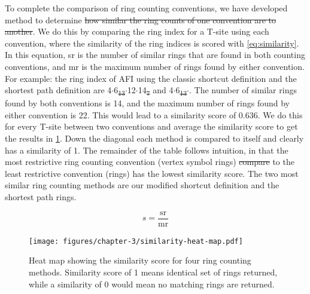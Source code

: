 \documentclass[preprint,numrefs,noinfo,sort&compress]{elsarticle}
\providecommand{\DIFadd}[1]{{\protect\color{blue}\uwave{#1}}} %
\providecommand{\DIFdel}[1]{{\protect\color{red}\sout{#1}}}                      %
\providecommand{\DIFaddbegin}{} %
\providecommand{\DIFaddend}{} %
\providecommand{\DIFdelbegin}{} %
\providecommand{\DIFdelend}{} %
\providecommand{\DIFaddbeginFL}{} %
\providecommand{\DIFaddendFL}{} %
\providecommand{\DIFdelbeginFL}{} %
\providecommand{\DIFdelendFL}{} %
\newcommand{\DIFscaledelfig}{0.5}
\newlength{\DIFdelgraphicswidth} %
\newlength{\DIFdelgraphicsheight} %
\newcommand{\DIFaddincludegraphics}[2][]{{\color{blue}\fbox{\DIFOincludegraphics[#1]{#2}}}} %
\newcommand{\DIFdelincludegraphics}[2][]{%
\sbox{\DIFdelgraphicsbox}{\DIFOincludegraphics[#1]{#2}}%
\settoboxwidth{\DIFdelgraphicswidth}{\DIFdelgraphicsbox} %
\settoboxtotalheight{\DIFdelgraphicsheight}{\DIFdelgraphicsbox} %
\scalebox{\DIFscaledelfig}{%
\parbox[b]{\DIFdelgraphicswidth}{\usebox{\DIFdelgraphicsbox}\\[-\baselineskip] \rule{\DIFdelgraphicswidth}{0em}}\llap{\resizebox{\DIFdelgraphicswidth}{\DIFdelgraphicsheight}{%
\setlength{\unitlength}{\DIFdelgraphicswidth}%
\begin{picture}(1,1)%
\thicklines\linethickness{2pt} %
{\color[rgb]{1,0,0}\put(0,0){\framebox(1,1){}}}%
{\color[rgb]{1,0,0}\put(0,0){\line( 1,1){1}}}%
{\color[rgb]{1,0,0}\put(0,1){\line(1,-1){1}}}%
\end{picture}%
}\hspace*{3pt}}} %
} %
\DeclareRobustCommand{\DIFaddbegin}{\DIFOaddbegin \let\includegraphics\DIFaddincludegraphics} %
\DeclareRobustCommand{\DIFaddend}{\DIFOaddend \let\includegraphics\DIFOincludegraphics} %
\DeclareRobustCommand{\DIFdelbegin}{\DIFOdelbegin \let\includegraphics\DIFdelincludegraphics} %
\DeclareRobustCommand{\DIFdelend}{\DIFOaddend \let\includegraphics\DIFOincludegraphics} %
\DeclareRobustCommand{\DIFaddbeginFL}{\DIFOaddbeginFL \let\includegraphics\DIFaddincludegraphics} %
\DeclareRobustCommand{\DIFaddendFL}{\DIFOaddendFL \let\includegraphics\DIFOincludegraphics} %
\DeclareRobustCommand{\DIFdelbeginFL}{\DIFOdelbeginFL \let\includegraphics\DIFdelincludegraphics} %
\DeclareRobustCommand{\DIFdelendFL}{\DIFOaddendFL \let\includegraphics\DIFOincludegraphics} %
\begin{document}
To complete the comparison of ring counting conventions, we have developed \DIFaddbegin \DIFadd{a }\DIFaddend method to determine \DIFdelbegin \DIFdel{how similar the ring counts of one convention are to another}\DIFdelend \DIFaddbegin \DIFadd{their similarity}\DIFaddend . We do this by comparing the ring index for a T-site using each convention, where the similarity of the ring indices is scored with \cref{eq:similarity}. In this equation, sr is the number of similar rings that are found in both counting conventions, and mr is the maximum number of rings found by either convention. For example: the ring index of AFI using the classic shortcut definition and the shortest path definition are 4\(\cdot\)6\DIFdelbegin \DIFdel{\textsubscript{13}\(\cdot\)}\DIFdelend \DIFaddbegin \DIFadd{\(_{\text{13}} \cdot\)}\DIFaddend 12\(\cdot\)14\DIFdelbegin \DIFdel{\textsubscript{7} }\DIFdelend \DIFaddbegin \DIFadd{\(_{\text{7}}\) }\DIFaddend and 4\(\cdot\)6\DIFdelbegin \DIFdel{\textsubscript{13}\(\cdot\)}\DIFdelend \DIFaddbegin \DIFadd{\(_{\text{13}} \cdot\)}\DIFaddend . The number of similar rings found by both conventions is 14, and the maximum number of rings found by either convention is 22. This would lead to a similarity score of 0.636. We do this for every T-site between two conventions and average the similarity score to get the results in \cref{fig:similarity}. Down the diagonal each method is compared to itself and clearly has a similarity of 1. The remainder of the table follows intuition, in that the  most restrictive ring counting convention (vertex symbol rings) \DIFdelbegin \DIFdel{compare }\DIFdelend \DIFaddbegin \DIFadd{compared }\DIFaddend to the least restrictive convention (rings) has the lowest similarity score. The two most similar ring counting methods are our modified shortcut definition and the shortest path rings. 

\begin{equation}\label{eq:similarity}
s = \mathrm{ \frac{sr}{mr} }
\end{equation}

\DIFdelbegin %
\DIFdelendFL \DIFaddbeginFL \begin{figure}[t]
\DIFaddendFL \centering
\DIFdelbeginFL %
\DIFdelendFL \DIFaddbeginFL \texttt{[image: figures/chapter-3/similarity-heat-map.pdf]}
\DIFaddendFL \caption{Heat map showing the similarity score for four ring counting methods. Similarity score of 1 means identical set of rings returned, while a similarity of 0 would mean no matching rings are returned. \label{fig:similarity}}
\end{figure}
\DIFdelbegin %
\DIFdelend 
\end{document}
